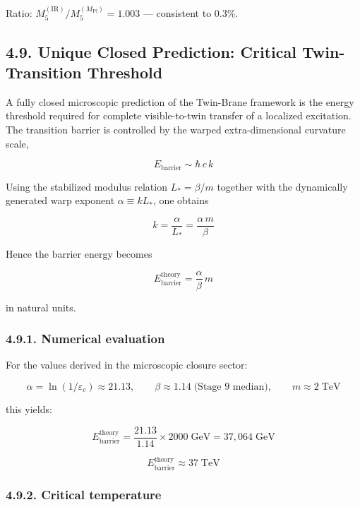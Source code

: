 \documentclass[
  11pt,
]{article}
\begin{document}
Ratio: \(M_5^{(\text{IR})}/M_5^{(M_{\text{Pl}})} = 1.003\) ---
consistent to 0.3\%.

\bigskip

\hypertarget{unique-closed-prediction-critical-twin-transition-threshold}{%
\subsection{4.9. Unique Closed Prediction: Critical Twin-Transition
Threshold}\label{unique-closed-prediction-critical-twin-transition-threshold}}

A fully closed microscopic prediction of the Twin-Brane framework is the
energy threshold required for complete visible-to-twin transfer of a
localized excitation. The transition barrier is controlled by the warped
extra-dimensional curvature scale,

\[E_{\text{barrier}} \sim \hbar\,c\,k \tag{198}\]

Using the stabilized modulus relation \(L_* = \beta/m\) together with
the dynamically generated warp exponent \(\alpha \equiv kL_*\), one
obtains

\[k = \frac{\alpha}{L_*} = \frac{\alpha\,m}{\beta} \tag{199}\]

Hence the barrier energy becomes

\[\boxed{E_{\text{barrier}}^{\text{theory}} = \frac{\alpha}{\beta}\,m} \tag{200}\]

in natural units.

\hypertarget{numerical-evaluation-1}{%
\subsubsection{4.9.1. Numerical
evaluation}\label{numerical-evaluation-1}}

For the values derived in the microscopic closure sector:

\[\alpha = \ln(1/\varepsilon_c) \approx 21.13, \qquad \beta \approx 1.14\;\text{(Stage 9 median)}, \qquad m \approx 2\;\text{TeV} \tag{201}\]

this yields:

\[E_{\text{barrier}}^{\text{theory}} = \frac{21.13}{1.14} \times 2000\;\text{GeV} = 37{,}064\;\text{GeV} \tag{202}\]

\[\boxed{E_{\text{barrier}}^{\text{theory}} \approx 37\;\text{TeV}} \tag{203}\]

\hypertarget{critical-temperature}{%
\subsubsection{4.9.2. Critical temperature}\label{critical-temperature}}
\end{document}
